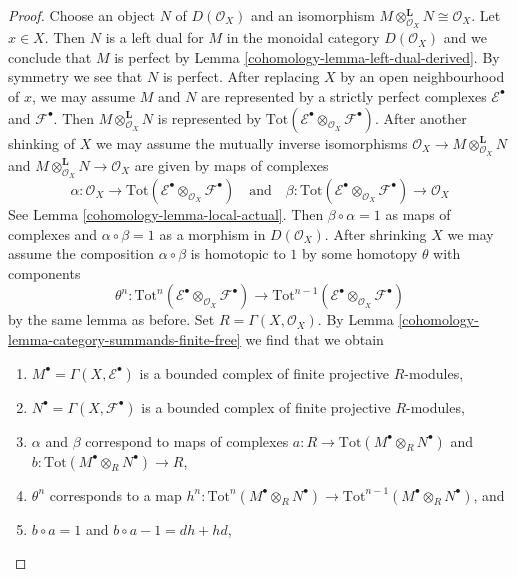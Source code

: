 \begin{proof}
\medskip\noindent
Choose an object $N$ of $D(\mathcal{O}_X)$
and an isomorphism
$M \otimes_{\mathcal{O}_X}^\mathbf{L} N \cong \mathcal{O}_X$.
Let $x \in X$.
Then $N$ is a left dual for $M$ in the monoidal category
$D(\mathcal{O}_X)$ and we conclude that $M$ is perfect by
Lemma \ref{cohomology-lemma-left-dual-derived}. By symmetry we see that
$N$ is perfect. After replacing $X$ by an open neighbourhood of $x$,
we may assume $M$ and $N$ are represented by a strictly perfect
complexes $\mathcal{E}^\bullet$ and $\mathcal{F}^\bullet$.
Then $M \otimes_{\mathcal{O}_X}^\mathbf{L} N$ is represented by
$\text{Tot}(\mathcal{E}^\bullet \otimes_{\mathcal{O}_X} \mathcal{F}^\bullet)$.
After another shinking of $X$ we may assume the mutually inverse
isomorphisms
$\mathcal{O}_X \to M \otimes_{\mathcal{O}_X}^\mathbf{L} N$ and
$M \otimes_{\mathcal{O}_X}^\mathbf{L} N \to \mathcal{O}_X$
are given by maps of complexes
$$
\alpha : \mathcal{O}_X \to
\text{Tot}(\mathcal{E}^\bullet \otimes_{\mathcal{O}_X} \mathcal{F}^\bullet)
\quad\text{and}\quad
\beta :
\text{Tot}(\mathcal{E}^\bullet \otimes_{\mathcal{O}_X} \mathcal{F}^\bullet)
\to \mathcal{O}_X
$$
See Lemma \ref{cohomology-lemma-local-actual}. Then $\beta \circ \alpha = 1$
as maps of complexes and $\alpha \circ \beta = 1$ as a morphism
in $D(\mathcal{O}_X)$. After shrinking $X$
we may assume the composition $\alpha \circ \beta$ is homotopic to $1$
by some homotopy $\theta$ with components
$$
\theta^n :
\text{Tot}^n(\mathcal{E}^\bullet \otimes_{\mathcal{O}_X} \mathcal{F}^\bullet)
\to
\text{Tot}^{n - 1}(
\mathcal{E}^\bullet \otimes_{\mathcal{O}_X} \mathcal{F}^\bullet)
$$
by the same lemma as before. Set $R = \Gamma(X, \mathcal{O}_X)$. By
Lemma \ref{cohomology-lemma-category-summands-finite-free}
we find that we obtain
\begin{enumerate}
\item $M^\bullet = \Gamma(X, \mathcal{E}^\bullet)$ is a bounded complex
of finite projective $R$-modules,
\item $N^\bullet = \Gamma(X, \mathcal{F}^\bullet)$ is a bounded complex
of finite projective $R$-modules,
\item $\alpha$ and $\beta$ correspond to maps of complexes
$a : R \to \text{Tot}(M^\bullet \otimes_R N^\bullet)$ and
$b : \text{Tot}(M^\bullet \otimes_R N^\bullet) \to R$,
\item $\theta^n$ corresponds to a map
$h^n : \text{Tot}^n(M^\bullet \otimes_R N^\bullet) \to
\text{Tot}^{n - 1}(M^\bullet \otimes_R N^\bullet)$, and
\item $b \circ a = 1$ and $b \circ a - 1 = dh + hd$,

\end{enumerate}
\end{proof}
